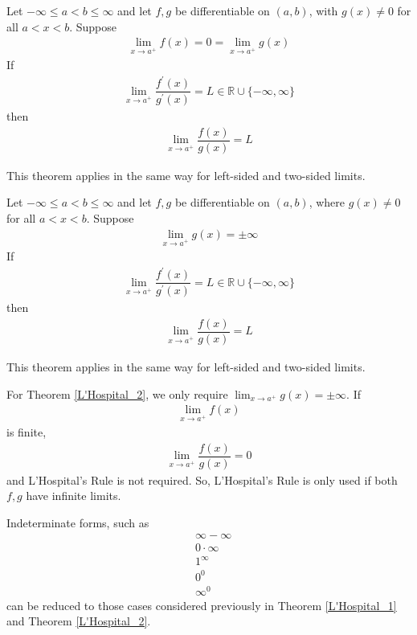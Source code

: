 \vspace{0.1in}
\begin{theorem}
Let $-\infty \leq a < b \leq \infty$ and let $f, g$ be differentiable on $(a, b)$, with $g(x) \neq 0$ for all $a < x < b$. Suppose 
\begin{align*}
    \lim_{x \longrightarrow a^{+}} f(x) = 0 = \lim_{x \longrightarrow a^{+}} g(x)
\end{align*}
If
\begin{align*}
    \lim_{x \longrightarrow a^{+}} \dfrac{f^{'}(x)}{g^{'}(x)} = L \in \mathbb{R} \cup \{-\infty, \infty\}
\end{align*}
then
\begin{align*}
    \lim_{x \longrightarrow a^{+}} \dfrac{f(x)}{g(x)} = L
\end{align*}
\label{L'Hospital_1}
\end{theorem}

\begin{note}
This theorem applies in the same way for left-sided and two-sided limits.
\end{note}

\begin{theorem}
Let $-\infty \leq a < b \leq \infty$ and let $f, g$ be differentiable on $(a, b)$, where $g(x) \neq 0$ for all $a < x < b$. Suppose
\begin{align*}
    \lim_{x \longrightarrow a^{+}} g(x) = \pm \infty 
\end{align*}
If
\begin{align*}
    \lim_{x \longrightarrow a^{+}} \dfrac{f^{'}(x)}{g^{'}(x)} = L \in \mathbb{R} \cup \{-\infty, \infty\}
\end{align*}
then
\begin{align*}
    \lim_{x \longrightarrow a^{+}} \dfrac{f(x)}{g(x)} = L
\end{align*}
\label{L'Hospital_2}
\end{theorem}

\begin{note}
This theorem applies in the same way for left-sided and two-sided limits.
\end{note}

\begin{note}
For Theorem \ref{L'Hospital_2}, we only require $\lim_{x \longrightarrow a^{+}} g(x) = \pm \infty$. If 
\begin{align*}
    \lim_{x \longrightarrow a^{+}} f(x)
\end{align*} 
is finite,
\begin{align*}
    \lim_{x \longrightarrow a^{+}} \dfrac{f(x)}{g(x)} = 0
\end{align*}
and L'Hospital's Rule is not required. So, L'Hospital's Rule is only used if both $f, g$ have infinite limits.
\end{note}

\begin{note}
Indeterminate forms, such as
\begin{align*}
    &\infty - \infty\\
    &0 \cdot \infty\\
    &1^{\infty}\\
    &0^{0}\\
    &\infty^{0}
\end{align*}
can be reduced to those cases considered previously in Theorem \ref{L'Hospital_1} and Theorem \ref{L'Hospital_2}.
\end{note}